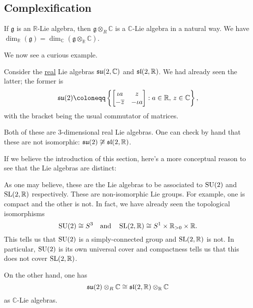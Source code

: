 \documentclass[12pt]{article}
\begin{document}
\subsection{Complexification}

If $\mathfrak{g}$ is an $\mathbb{R}$-Lie algebra, then $\mathfrak{g} \otimes_{R} \mathbb{C}$ is a $\mathbb{C}$-Lie algebra in a natural way. 
We have $\dim_{\mathbb{R}}(\mathfrak{g}) = \dim_{\mathbb{C}}(\mathfrak{g} \otimes_{\mathbb{R}} \mathbb{C})$.

We now see a curious example. 

Consider the \underline{real} Lie algebras $\su(2, \mathbb{C})$ and $\sl(2, \mathbb{R})$. 
We had already seen the latter; the former is
\begin{equation*} 
	\su(2) \coloneqq \left\{\two{\iota a}{z}{-\overline{z}}{-\iota a} : a \in \mathbb{R},\, z \in \mathbb{C}\right\},
\end{equation*}
with the bracket being the usual commutator of matrices.

Both of these are $3$-dimensional real Lie algebras. One can check by hand that these are not isomorphic: $\su(2) \not\cong \sl(2, \mathbb{R})$. \newline

\begin{blockquote}
	If we believe the introduction of this section, here's a more conceptual reason to see that the Lie algebras are distinct:

	As one may believe, these are the Lie algebras to be associated to $\SU(2)$ and $\SL(2, \mathbb{R})$ respectively. 
	These are non-isomorphic Lie groups. For example, one is compact and the other is not. 
	In fact, we have already seen the topological isomorphisms
	\begin{equation*} 
		\SU(2) \cong S^{3} \andd \SL(2, \mathbb{R}) \cong S^{1} \times \mathbb{R}_{> 0} \times \mathbb{R}.
	\end{equation*}
	This tells us that $\SU(2)$ is a simply-connected group and $\SL(2, \mathbb{R})$ is not. 
	In particular, $\SU(2)$ is its own universal cover and compactness tells us that this does not cover $\SL(2, \mathbb{R})$. 
\end{blockquote}

On the other hand, one has
\begin{equation*} 
	\su(2) \otimes_{R} \mathbb{C} \cong \sl(2, \mathbb{R}) \otimes_{\mathbb{R}} \mathbb{C}
\end{equation*}
as $\mathbb{C}$-Lie algebras.
\end{document}

